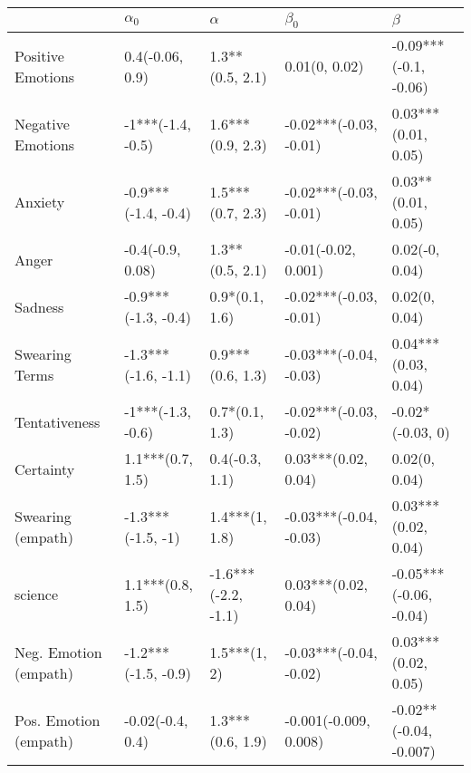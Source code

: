 \begin{tabular}{lllll}
\toprule
{} &           $\alpha_0$ &             $\alpha$ &               $\beta_0$ &                 $\beta$ \\
\midrule
Positive Emotions     &      0.4(-0.06, 0.9) &      1.3**(0.5, 2.1) &           0.01(0, 0.02) &   -0.09***(-0.1, -0.06) \\
Negative Emotions     &    -1***(-1.4, -0.5) &     1.6***(0.9, 2.3) &  -0.02***(-0.03, -0.01) &     0.03***(0.01, 0.05) \\
Anxiety               &  -0.9***(-1.4, -0.4) &     1.5***(0.7, 2.3) &  -0.02***(-0.03, -0.01) &      0.03**(0.01, 0.05) \\
Anger                 &     -0.4(-0.9, 0.08) &      1.3**(0.5, 2.1) &     -0.01(-0.02, 0.001) &          0.02(-0, 0.04) \\
Sadness               &  -0.9***(-1.3, -0.4) &       0.9*(0.1, 1.6) &  -0.02***(-0.03, -0.01) &           0.02(0, 0.04) \\
Swearing Terms        &  -1.3***(-1.6, -1.1) &     0.9***(0.6, 1.3) &  -0.03***(-0.04, -0.03) &     0.04***(0.03, 0.04) \\
Tentativeness         &    -1***(-1.3, -0.6) &       0.7*(0.1, 1.3) &  -0.02***(-0.03, -0.02) &        -0.02*(-0.03, 0) \\
Certainty             &     1.1***(0.7, 1.5) &       0.4(-0.3, 1.1) &     0.03***(0.02, 0.04) &           0.02(0, 0.04) \\
Swearing (empath)     &    -1.3***(-1.5, -1) &       1.4***(1, 1.8) &  -0.03***(-0.04, -0.03) &     0.03***(0.02, 0.04) \\
science               &     1.1***(0.8, 1.5) &  -1.6***(-2.2, -1.1) &     0.03***(0.02, 0.04) &  -0.05***(-0.06, -0.04) \\
Neg. Emotion (empath) &  -1.2***(-1.5, -0.9) &         1.5***(1, 2) &  -0.03***(-0.04, -0.02) &     0.03***(0.02, 0.05) \\
Pos. Emotion (empath) &     -0.02(-0.4, 0.4) &     1.3***(0.6, 1.9) &   -0.001(-0.009, 0.008) &  -0.02**(-0.04, -0.007) \\
\bottomrule
\end{tabular}
